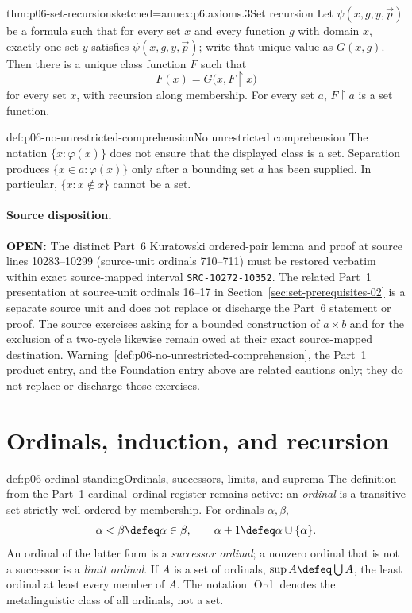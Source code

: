 \begin{hbtheorem}{thm:p06-set-recursion}{sketched=annex:p6.axioms.3}{Set recursion}
Let \(\psi(x,g,y,\vec p)\) be a formula such that for every set \(x\) and
every function \(g\) with domain \(x\), exactly one set \(y\) satisfies
\(\psi(x,g,y,\vec p)\); write that unique value as \(G(x,g)\).  Then there
is a unique class function \(F\) such that
\[
 F(x)=G\bigl(x,F\mathbin{\upharpoonright}x\bigr)
\]
for every set \(x\), with recursion along membership.  For every set \(a\),
\(F\mathbin{\upharpoonright}a\) is a set function.
\end{hbtheorem}

\begin{hbwarning}{def:p06-no-unrestricted-comprehension}{No unrestricted comprehension}
The notation \(\{x:\varphi(x)\}\) does not ensure that the displayed class is
a set.  Separation produces \(\{x\in a:\varphi(x)\}\) only after a bounding
set \(a\) has been supplied.  In particular, \(\{x:x\notin x\}\) cannot be a
set.
\end{hbwarning}

\paragraph{Source disposition.}
\textbf{OPEN:} The distinct Part~6 Kuratowski ordered-pair lemma and proof at
source lines 10283--10299 (source-unit ordinals 710--711) must be restored
verbatim within exact source-mapped interval \texttt{SRC-10272-10352}.  The
related Part~1 presentation at source-unit ordinals 16--17 in
Section~\ref{sec:set-prerequisites-02} is a separate source unit and does not
replace or discharge the Part~6 statement or proof.  The source exercises
asking for a bounded construction of \(a\times b\) and for the exclusion of a
two-cycle likewise remain owed at their exact source-mapped destination.
Warning~\ref{def:p06-no-unrestricted-comprehension}, the Part~1 product entry,
and the Foundation entry above are related cautions only; they do not replace
or discharge those exercises.

\section{Ordinals, induction, and recursion}
\label{sec:p06-ordinals}

\begin{hbconvention}{def:p06-ordinal-standing}{Ordinals, successors, limits, and suprema}
The definition from the Part~1 cardinal--ordinal register remains active: an
\emph{ordinal} is a transitive set strictly well-ordered by membership.  For
ordinals \(\alpha,\beta\),
\[
 \alpha<\beta\defeq\alpha\in\beta,
 \qquad
 \alpha+1\defeq\alpha\cup\{\alpha\}.
\]
An ordinal of the latter form is a \emph{successor ordinal}; a nonzero ordinal
that is not a successor is a \emph{limit ordinal}.  If \(A\) is a set of
ordinals, \(\sup A\defeq\bigcup A\), the least ordinal at least every member
of \(A\).  The notation \(\operatorname{Ord}\) denotes the metalinguistic
class of all ordinals, not a set.
\end{hbconvention}

